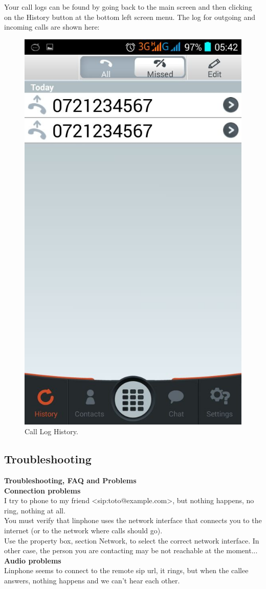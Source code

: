 \documentclass[a4paper]{article}
\begin{document}
Your call logs can be found by going back to the main screen and then clicking on the History button at the bottom left screen menu. The log for outgoing and incoming calls are shown here:

\begin{center}
\begin{figure}[H]
\centering
\includegraphics[width=0.4\linewidth]{pictures/Screenshot_2015-08-04-05-42-53.png}
\caption{\label{fig:Screen9}Call Log History.}
\end{figure}
\end{center}

\newpage
\subsection{Troubleshooting}
\textbf{Troubleshooting, FAQ and Problems} \\

\textbf{Connection problems} \\
I try to phone to my friend <sip:toto@example.com>, but nothing happens, no ring, nothing
at all. \\
You must verify that linphone uses the network interface that connects you to the
internet (or to the network where calls should go). \\
Use the property box, section Network, to select the correct network interface.
In other case, the person you are contacting may be not reachable at the moment... \\

\textbf{Audio problems} \\
Linphone seems to connect to the remote sip url, it rings, but when the callee answers,
nothing happens and we can't hear each other. \\
\end{document}
